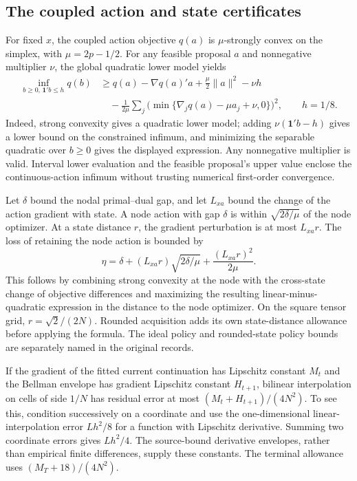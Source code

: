 \documentclass[ecta,nameyear,draft]{econsocart}
\begin{document}
\subsection{The coupled action and state certificates}
For fixed $x$, the coupled action objective $q(a)$ is $\mu$-strongly convex on the simplex, with $\mu=2p-1/2$. For any feasible proposal $a$ and nonnegative multiplier $\nu$, the global quadratic lower model yields
\begin{align*}
 \inf_{b\geq0,\,\mathbf1'b\leq h}q(b)
 &\geq q(a)-\nabla q(a)'a+\tfrac\mu2\|a\|^2-\nu h\\
 &\quad-\frac1{2\mu}\sum_j
          \bigl(\min\{\nabla_jq(a)-\mu a_j+\nu,0\}\bigr)^2,
 \qquad h=1/8.
\end{align*}
Indeed, strong convexity gives a quadratic lower model; adding $\nu(\mathbf1'b-h)$ gives a lower bound on the constrained infimum, and minimizing the separable quadratic over $b\geq0$ gives the displayed expression. Any nonnegative multiplier is valid. Interval lower evaluation and the feasible proposal's upper value enclose the continuous-action infimum without trusting numerical first-order convergence.

Let $\delta$ bound the nodal primal--dual gap, and let $L_{xa}$ bound the change of the action gradient with state. A node action with gap $\delta$ is within $\sqrt{2\delta/\mu}$ of the node optimizer. At a state distance $r$, the gradient perturbation is at most $L_{xa}r$. The loss of retaining the node action is bounded by
\[
 \eta=\delta+(L_{xa}r)\sqrt{2\delta/\mu}
                 +\frac{(L_{xa}r)^2}{2\mu}.
\]
This follows by combining strong convexity at the node with the cross-state change of objective differences and maximizing the resulting linear-minus-quadratic expression in the distance to the node optimizer. On the square tensor grid, $r=\sqrt2/(2N)$. Rounded acquisition adds its own state-distance allowance before applying the formula. The ideal policy and rounded-state policy bounds are separately named in the original records.

If the gradient of the fitted current continuation has Lipschitz constant $M_t$ and the Bellman envelope has gradient Lipschitz constant $H_{t+1}$, bilinear interpolation on cells of side $1/N$ has residual error at most $(M_t+H_{t+1})/(4N^2)$. To see this, condition successively on a coordinate and use the one-dimensional linear-interpolation error $Lh^2/8$ for a function with Lipschitz derivative. Summing two coordinate errors gives $Lh^2/4$. The source-bound derivative envelopes, rather than empirical finite differences, supply these constants. The terminal allowance uses $(M_T+18)/(4N^2)$.
\end{document}
